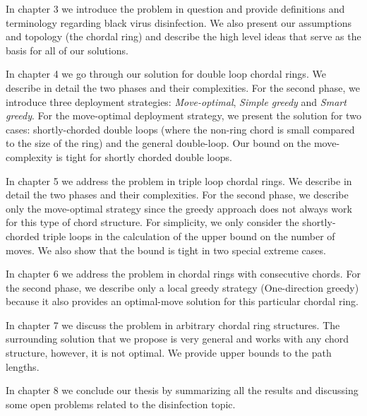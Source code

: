 In chapter  3  we introduce the problem in question and provide definitions and terminology regarding black virus disinfection. We also present our assumptions and topology (the chordal ring) and describe the high level ideas that serve as the basis for all of our solutions.

In chapter 4 we go through our solution for double loop chordal rings. 
We describe in detail the two phases and  their complexities. For the second phase, we  introduce  three deployment strategies: {\em Move-optimal}, {\em Simple greedy} and {\em Smart greedy}. For the move-optimal deployment strategy, we present the solution for two cases: shortly-chorded double loops (where the non-ring chord is small compared to the size of the ring) and the general double-loop.  Our bound on the move-complexity is tight for shortly chorded double loops.

In chapter 5 we address the problem in  triple loop chordal rings. 
We describe in detail the two phases and  their complexities. For the second phase, we  describe only the move-optimal strategy since the greedy approach does not always work for this type of chord structure. For simplicity, we only consider  the shortly-chorded triple loops in the calculation of the upper bound on the number of moves. We also show that the  bound is tight in  two special extreme cases.

In chapter 6 we address the problem in chordal rings with consecutive chords.   For  the second phase, we describe only a local greedy strategy (One-direction greedy) because it also provides an optimal-move solution for this particular chordal ring.

In chapter 7 we discuss the problem in  arbitrary chordal ring structures. 
The surrounding solution that we propose is very general and works with any chord structure, however, it is not  optimal. We provide upper bounds to the path lengths. 


In chapter 8 we conclude our thesis by summarizing all the results and discussing some open problems related to the \bv disinfection topic.

